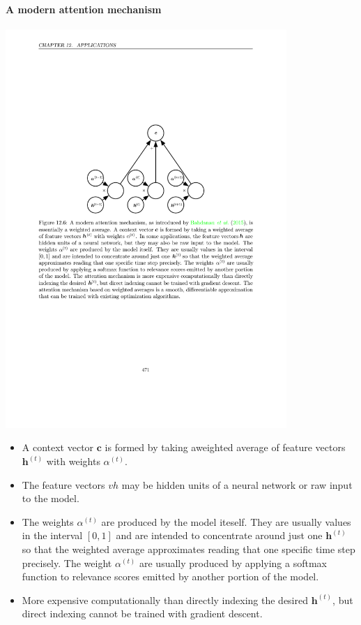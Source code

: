\documentclass[12pt, a4paper]{article}
\def\vc{\boldsymbol{c}}
\newcommand{\egvh}[1]{\boldsymbol{h}^{(#1)}}
\begin{document}
\paragraph{A modern attention mechanism}
\begin{center}
    \includegraphics[width=0.8\textwidth]{../imgs/Attention_Mechanism.pdf}
\end{center}
\begin{itemize}
    \item A context vector $\vc$ is formed by taking aweighted average of feature vectors $\egvh{t}$ with weights $\alpha^{(t)}$.
    \item The feature vectors $vh$ may be hidden units of a neural network or raw input to the model.
    \item The weights $\alpha^{(t)}$ are produced by the model iteself. They are usually values in the interval $[0, 1]$ and are intended to concentrate around just one $\egvh{t}$ so that the weighted average approximates reading that one specific time step precisely. The weight $\alpha^{(t)}$ are usually produced by applying a softmax function to relevance scores emitted by another portion of the model.
    \item More expensive computationally than directly indexing the desired $\egvh{t}$, but direct indexing cannot be trained with gradient descent.
\end{itemize}
\end{document}
